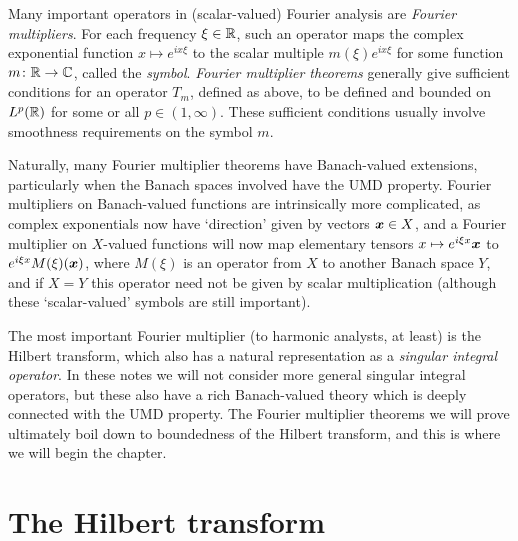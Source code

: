 Many important operators in (scalar-valued) Fourier analysis are \emph{Fourier multipliers}.
For each frequency $\xi \in \mathbb{R}$, such an operator maps the complex exponential function $x \mapsto e^{ix\xi}$ to the scalar multiple $m(\xi)e^{ix\xi}$ for some function $m \colon \mathbb{R} \rightarrow \mathbb{C}$, called the \emph{symbol}.
\emph{Fourier multiplier theorems} generally give sufficient conditions for an operator $T_{m}$, defined as above, to be defined and bounded on $L^{p}(\mathbb{R})$ for some or all $p \in (1,\infty)$.
These sufficient conditions usually involve smoothness requirements on the symbol $m$.

Naturally, many Fourier multiplier theorems have Banach-valued extensions, particularly when the Banach spaces involved have the UMD property.
Fourier multipliers on Banach-valued functions are intrinsically more complicated, as complex exponentials now have `direction' given by vectors $\bm{x} \in X$, and a Fourier multiplier on $X$-valued functions will now map elementary tensors $x \mapsto e^{i\xi x}\bm{x}$ to $e^{i\xi x}M(\xi)(\bm{x})$, where $M(\xi)$ is an operator from $X$ to another Banach space $Y$, and if $X = Y$ this operator need not be given by scalar multiplication (although these `scalar-valued' symbols are still important).

The most important Fourier multiplier (to harmonic analysts, at least) is the Hilbert transform, which also has a natural representation as a \emph{singular integral operator}.
In these notes we will not consider more general singular integral operators, but these also have a rich Banach-valued theory which is deeply connected with the UMD property.
The Fourier multiplier theorems we will prove ultimately boil down to boundedness of the Hilbert transform, and this is where we will begin the chapter.

\section{The Hilbert transform}

